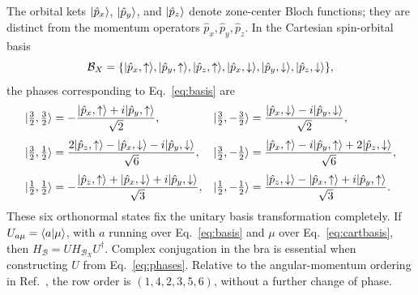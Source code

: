 The orbital kets $\lvert  \hat{p}_ x\rangle$, $\lvert  \hat{p}_ y\rangle$, and $\lvert  \hat{p}_ z\rangle$ denote zone-center Bloch functions; they are distinct from the momentum operators $ \hat{p}_ x, \hat{p}_ y, \hat{p}_ z$. In the Cartesian spin-orbital basis
\begin{equation}
\mathcal B_X=\{
\lvert  \hat{p}_ x,\uparrow\rangle,\lvert  \hat{p}_ y,\uparrow\rangle,\lvert  \hat{p}_ z,\uparrow\rangle,
\lvert  \hat{p}_ x,\downarrow\rangle,\lvert  \hat{p}_ y,\downarrow\rangle,\lvert  \hat{p}_ z,\downarrow\rangle\},
\label{eq:cartbasis}
\end{equation}
the phases corresponding to Eq.~\eqref{eq:basis} are~\cite{delvecchio2026}
\begin{align}
\lvert \tfrac32,\tfrac32\rangle
&=-\frac{\lvert  \hat{p}_ x,\uparrow\rangle+i\lvert  \hat{p}_ y,\uparrow\rangle}{\sqrt2},
&\lvert \tfrac32,-\tfrac32\rangle
&=\frac{\lvert  \hat{p}_ x,\downarrow\rangle-i\lvert  \hat{p}_ y,\downarrow\rangle}{\sqrt2},
\nonumber\\[3pt]
\lvert \tfrac32,\tfrac12\rangle
&=\frac{2\lvert  \hat{p}_ z,\uparrow\rangle-\lvert  \hat{p}_ x,\downarrow\rangle-i\lvert  \hat{p}_ y,\downarrow\rangle}{\sqrt6},
&\lvert \tfrac32,-\tfrac12\rangle
&=\frac{\lvert  \hat{p}_ x,\uparrow\rangle-i\lvert  \hat{p}_ y,\uparrow\rangle+2\lvert  \hat{p}_ z,\downarrow\rangle}{\sqrt6},
\nonumber\\[3pt]
\lvert \tfrac12,\tfrac12\rangle
&=-\frac{\lvert  \hat{p}_ z,\uparrow\rangle+\lvert  \hat{p}_ x,\downarrow\rangle+i\lvert  \hat{p}_ y,\downarrow\rangle}{\sqrt3},
&\lvert \tfrac12,-\tfrac12\rangle
&=\frac{\lvert  \hat{p}_ z,\downarrow\rangle-\lvert  \hat{p}_ x,\uparrow\rangle+i\lvert  \hat{p}_ y,\uparrow\rangle}{\sqrt3}.
\label{eq:phases}
\end{align}
These six orthonormal states fix the unitary basis transformation completely. If $U_{a\mu}=\langle a\vert \mu\rangle$, with $a$ running over Eq.~\eqref{eq:basis} and $\mu$ over Eq.~\eqref{eq:cartbasis}, then $H_{\mathcal B}=UH_{\mathcal B_X}U^\dagger$. Complex conjugation in the bra is essential when constructing $U$ from Eq.~\eqref{eq:phases}. Relative to the angular-momentum ordering in Ref.~\cite{delvecchio2026}, the row order is $(1,4,2,3,5,6)$, without a further change of phase.

